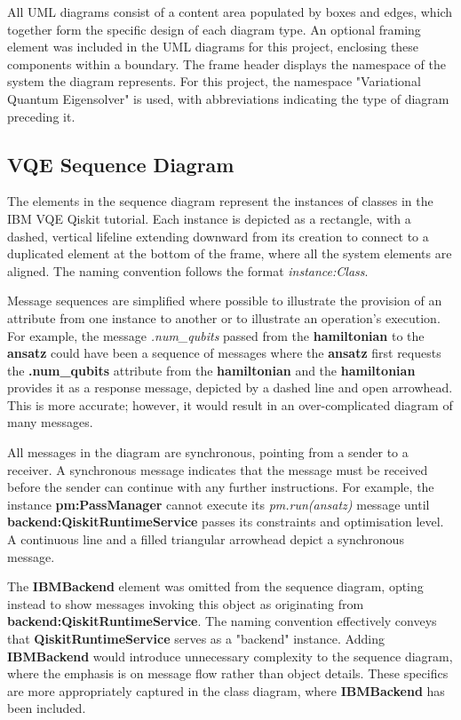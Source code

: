 \documentclass{article}
\begin{document}
All UML diagrams consist of a content area populated by boxes and edges, which together form the specific design of each diagram type. An optional framing element was included in the UML diagrams for this project, enclosing these components within a boundary. The frame header displays the namespace of the system the diagram represents\cite{OMG_UML}. For this project, the namespace "Variational Quantum Eigensolver" is used, with abbreviations indicating the type of diagram preceding it. 

\subsection{VQE Sequence Diagram}

The elements in the sequence diagram represent the instances of classes in the IBM VQE Qiskit tutorial. Each instance is depicted as a rectangle, with a dashed, vertical lifeline extending downward from its creation to connect to a duplicated element at the bottom of the frame, where all the system elements are aligned. The naming convention follows the format \textit{instance:Class}.

Message sequences are simplified where possible to illustrate the provision of an attribute from one instance to another or to illustrate an operation's execution. For example, the message \textit{.num\_qubits} passed from the \textbf{hamiltonian} to the \textbf{ansatz} could have been a sequence of messages where the \textbf{ansatz} first requests the \textbf{.num\_qubits} attribute from the \textbf{hamiltonian} and the \textbf{hamiltonian} provides it as a response message, depicted by a dashed line and open arrowhead. This is more accurate; however, it would result in an over-complicated diagram of many messages. 

All messages in the diagram are synchronous, pointing from a sender to a receiver. A synchronous message indicates that the message must be received before the sender can continue with any further instructions\cite{Seidl_Scholz_Huemer_Kappel_Duffy_2014}. For example, the instance \textbf{pm:PassManager} cannot execute its \textit{pm.run(ansatz)} message until \textbf{backend:QiskitRuntimeService} passes its constraints and optimisation level. A continuous line and a filled triangular arrowhead depict a synchronous message.

The \textbf{IBMBackend} element was omitted from the sequence diagram, opting instead to show messages invoking this object as originating from \textbf{backend:QiskitRuntimeService}.
The naming convention effectively conveys that \textbf{QiskitRuntimeService} serves as a "backend" instance. Adding \textbf{IBMBackend} would introduce unnecessary complexity to the sequence diagram, where the emphasis is on message flow rather than object details. These specifics are more appropriately captured in the class diagram, where \textbf{IBMBackend} has been included.
\end{document}
